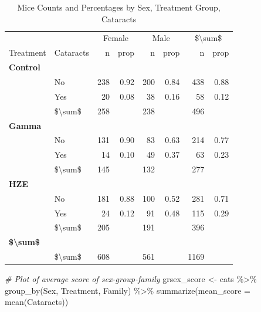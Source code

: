\documentclass[
]{article}
\newenvironment{Shaded}{\begin{snugshade}}{\end{snugshade}}
\newcommand{\AttributeTok}[1]{\textcolor[rgb]{0.77,0.63,0.00}{#1}}
\newcommand{\CommentTok}[1]{\textcolor[rgb]{0.56,0.35,0.01}{\textit{#1}}}
\newcommand{\FunctionTok}[1]{\textcolor[rgb]{0.00,0.00,0.00}{#1}}
\newcommand{\NormalTok}[1]{#1}
\newcommand{\OtherTok}[1]{\textcolor[rgb]{0.56,0.35,0.01}{#1}}
\newcommand{\SpecialCharTok}[1]{\textcolor[rgb]{0.00,0.00,0.00}{#1}}
\begin{document}
\begin{table}[!h]

\caption{\label{tab:table}Mice Counts and Percentages by Sex, Treatment Group, Cataracts}
\centering
\begin{tabular}[t]{l|l|r|r|r|r|r|r}
\hline
\multicolumn{2}{c|}{ } & \multicolumn{2}{c|}{Female} & \multicolumn{2}{c|}{Male} & \multicolumn{2}{c}{\$\textbackslash{}sum\$} \\
\cline{3-4} \cline{5-6} \cline{7-8}
Treatment & Cataracts & n & prop & n & prop & n & prop\\
\hline
\multicolumn{8}{l}{\textbf{Control}}\\
\hline
\hspace{1em} & No & 238 & 0.92 & 200 & 0.84 & 438 & 0.88\\
\hline
\hspace{1em} & Yes & 20 & 0.08 & 38 & 0.16 & 58 & 0.12\\
\hline
\hspace{1em} & \$\textbackslash{}sum\$ & 258 &  & 238 &  & 496 & \\
\hline
\multicolumn{8}{l}{\textbf{Gamma}}\\
\hline
\hspace{1em} & No & 131 & 0.90 & 83 & 0.63 & 214 & 0.77\\
\hline
\hspace{1em} & Yes & 14 & 0.10 & 49 & 0.37 & 63 & 0.23\\
\hline
\hspace{1em} & \$\textbackslash{}sum\$ & 145 &  & 132 &  & 277 & \\
\hline
\multicolumn{8}{l}{\textbf{HZE}}\\
\hline
\hspace{1em} & No & 181 & 0.88 & 100 & 0.52 & 281 & 0.71\\
\hline
\hspace{1em} & Yes & 24 & 0.12 & 91 & 0.48 & 115 & 0.29\\
\hline
\hspace{1em} & \$\textbackslash{}sum\$ & 205 &  & 191 &  & 396 & \\
\hline
\multicolumn{8}{l}{\textbf{\$\textbackslash{}sum\$}}\\
\hline
\hspace{1em} & \$\textbackslash{}sum\$ & 608 &  & 561 &  & 1169 & \\
\hline
\end{tabular}
\end{table}

\begin{Shaded}
\begin{Highlighting}[]
\CommentTok{\# Plot of average score of sex{-}group{-}family}
\NormalTok{grsex\_score }\OtherTok{\textless{}{-}}\NormalTok{ cats }\SpecialCharTok{\%\textgreater{}\%}
  \FunctionTok{group\_by}\NormalTok{(Sex, Treatment, Family) }\SpecialCharTok{\%\textgreater{}\%}
  \FunctionTok{summarize}\NormalTok{(}\AttributeTok{mean\_score =} \FunctionTok{mean}\NormalTok{(Cataracts))}
\end{Highlighting}
\end{Shaded}
\end{document}

